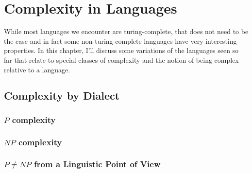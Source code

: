 \section{Complexity in Languages}
\label{sec:complexity}
While most languages we encounter are turing-complete, that does not need
to be the case and in fact some non-turing-complete languages have very
interesting properties. In this chapter, I'll discuss some variations of
the languages seen so far that relate to special classes of complexity and
the notion of being complex relative to a language.
\subsection{Complexity by Dialect} %
\label{sub:Complexity by Dialect}
\subsubsection{$P$ complexity} %
\label{ssub:P-complexity}

\subsubsection{$NP$ complexity} %
\label{ssub:NP-complexity}

\subsubsection{$P \neq NP$ from a Linguistic Point of View} %
\label{ssub:PNP from a Linguistic Point of View}


